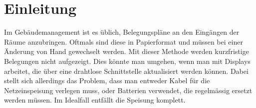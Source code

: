 \section{Einleitung}
\label{sec:intro}

Im Gebäudemanagement ist es üblich, Belegungspläne an den Eingängen der Räume anzubringen.
Oftmals sind diese in Papierformat und müssen bei einer Änderung von Hand gewechselt werden.
Mit dieser Methode werden kurzfristige Belegungen nicht aufgezeigt.
Dies könnte man umgehen, wenn man mit Displays arbeitet, die über eine drahtlose Schnittstelle aktualisiert werden können.
Dabei stellt sich allerdings das Problem, dass man entweder Kabel für die Netzeinspeisung verlegen muss, oder Batterien verwendet, die regelmässig ersetzt werden müssen.
Im Idealfall entfällt die Speisung komplett.